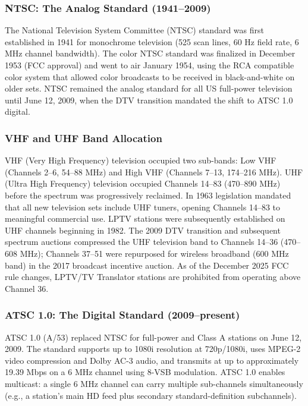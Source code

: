 \documentclass[11pt,letterpaper]{article}
\begin{document}
\subsubsection{NTSC: The Analog Standard (1941--2009)}

The National Television System Committee (NTSC) standard was first established in 1941 for monochrome television (525 scan lines, 60 Hz field rate, 6 MHz channel bandwidth). The color NTSC standard was finalized in December 1953 (FCC approval) and went to air January 1954, using the RCA compatible color system that allowed color broadcasts to be received in black-and-white on older sets. NTSC remained the analog standard for all US full-power television until June 12, 2009, when the DTV transition mandated the shift to ATSC 1.0 digital.

\subsubsection{VHF and UHF Band Allocation}

VHF (Very High Frequency) television occupied two sub-bands: Low VHF (Channels 2--6, 54--88 MHz) and High VHF (Channels 7--13, 174--216 MHz). UHF (Ultra High Frequency) television occupied Channels 14--83 (470--890 MHz) before the spectrum was progressively reclaimed. In 1963 legislation mandated that all new television sets include UHF tuners, opening Channels 14--83 to meaningful commercial use. LPTV stations were subsequently established on UHF channels beginning in 1982. The 2009 DTV transition and subsequent spectrum auctions compressed the UHF television band to Channels 14--36 (470--608 MHz); Channels 37--51 were repurposed for wireless broadband (600 MHz band) in the 2017 broadcast incentive auction. As of the December 2025 FCC rule changes, LPTV/TV Translator stations are prohibited from operating above Channel 36.

\subsubsection{ATSC 1.0: The Digital Standard (2009--present)}

ATSC 1.0 (A/53) replaced NTSC for full-power and Class A stations on June 12, 2009. The standard supports up to 1080i resolution at 720p/1080i, uses MPEG-2 video compression and Dolby AC-3 audio, and transmits at up to approximately 19.39 Mbps on a 6 MHz channel using 8-VSB modulation. ATSC 1.0 enables multicast: a single 6 MHz channel can carry multiple sub-channels simultaneously (e.g., a station's main HD feed plus secondary standard-definition subchannels).
\end{document}
